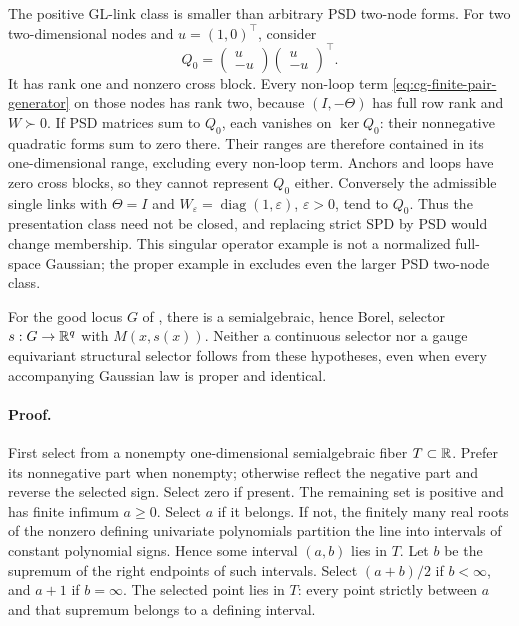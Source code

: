The positive GL-link class is smaller than arbitrary PSD
two-node forms. For two two-dimensional nodes and
\(u=(1,0)^\top\), consider
\begin{equation}
Q_0=\begin{pmatrix}u\\-u\end{pmatrix}
\begin{pmatrix}u\\-u\end{pmatrix}^{\top}.
\label{eq:cg-finite-pair-strict-boundary}
\end{equation}
It has rank one and nonzero cross block. Every non-loop term
\eqref{eq:cg-finite-pair-generator} on those nodes has rank two,
because \((I,-\Theta)\) has full row rank and \(W\succ0\).
If PSD matrices sum to \(Q_0\), each vanishes on
\(\ker Q_0\): their nonnegative quadratic forms sum to zero
there. Their ranges are therefore contained in its
one-dimensional range, excluding every non-loop term.
Anchors and loops have zero cross blocks, so they cannot
represent \(Q_0\) either. Conversely the admissible single
links with \(\Theta=I\) and
\(W_\varepsilon=\operatorname{diag}(1,\varepsilon)\),
\(\varepsilon>0\), tend to \(Q_0\). Thus the presentation
class need not be closed, and replacing strict SPD by PSD
would change membership. This singular operator example is
not a normalized full-space Gaussian; the proper example in
 excludes even
the larger PSD two-node class.

For the good locus \(G\) of
, there is a
semialgebraic, hence Borel, selector \(s:G\to\mathbb R^q\) with
\(M(x,s(x))\). Neither a continuous selector nor a gauge
equivariant structural selector follows from these hypotheses,
even when every accompanying Gaussian law is proper and
identical. 

\paragraph{Proof.}
First select from a nonempty one-dimensional semialgebraic
fiber \(T\subset\mathbb R\). Prefer its nonnegative part when
nonempty; otherwise reflect the negative part and reverse
the selected sign. Select zero if present. The remaining
set is positive and has finite infimum \(a\geq0\). Select
\(a\) if it belongs. If not, the finitely many real roots of
the nonzero defining univariate polynomials partition the line into
intervals of constant polynomial signs. Hence some interval
\((a,b)\) lies in \(T\). Let \(b\) be the supremum of the
right endpoints of such intervals. Select \((a+b)/2\) if
\(b<\infty\), and \(a+1\) if \(b=\infty\). The selected
point lies in \(T\): every point strictly between \(a\) and
that supremum belongs to a defining interval.

